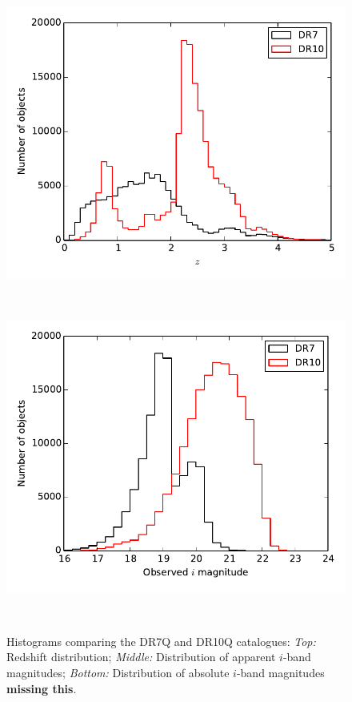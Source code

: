 \begin{figure}
  \centering
  \begin{minipage}[b]{0.5\textwidth}
    \includegraphics[width=\textwidth]{figures/chapter06/zhist}
  \end{minipage}\\
  \begin{minipage}[b]{0.5\textwidth}
    \includegraphics[width=\textwidth]{figures/chapter06/mihist}
  \end{minipage}\\ 
  \caption{Histograms comparing the DR7Q and DR10Q catalogues: {\it Top:} Redshift distribution; {\it Middle:} Distribution of apparent $i$-band magnitudes; {\it Bottom:} Distribution of absolute $i$-band magnitudes {\bf missing this}.} 
  \label{fig:histograms}
\end{figure}

